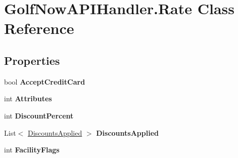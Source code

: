 \hypertarget{class_golf_now_a_p_i_handler_1_1_rate}{}\section{Golf\+Now\+A\+P\+I\+Handler.\+Rate Class Reference}
\label{class_golf_now_a_p_i_handler_1_1_rate}
\subsection*{Properties}
\begin{DoxyCompactItemize}
\item 
\mbox{\label{class_golf_now_a_p_i_handler_1_1_rate_a219979cf30d8b92a6bd25b659988c6a1}} 
bool {\bfseries Accept\+Credit\+Card}
\item 
\mbox{\label{class_golf_now_a_p_i_handler_1_1_rate_a597cba43759b80b0790ce1a9a4c68803}} 
int {\bfseries Attributes}
\item 
\mbox{\label{class_golf_now_a_p_i_handler_1_1_rate_a2eb880aef166687e459186976c404619}} 
int {\bfseries Discount\+Percent}
\item 
\mbox{\label{class_golf_now_a_p_i_handler_1_1_rate_a45c868406116b5fd421eb170142bf5f6}} 
List$<$ \mbox{\hyperlink{class_golf_now_a_p_i_handler_1_1_discounts_applied}{Discounts\+Applied}} $>$ {\bfseries Discounts\+Applied}
\item 
\mbox{\label{class_golf_now_a_p_i_handler_1_1_rate_a424b919d8faaeb010e0ff85f4a968ab1}} 
int {\bfseries Facility\+Flags}
\item 
\mbox{\label{class_golf_now_a_p_i_handler_1_1_rate_a0343fbb430be67d258b7350c0a500b6e}} 

\end{DoxyCompactItemize}
